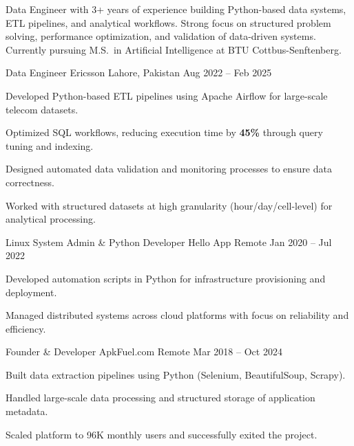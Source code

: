 \documentclass[11pt, a4paper]{awesome-cv}
\begin{document}
\makecvheader[C]


\begin{cvparagraph}
Data Engineer with 3+ years of experience building Python-based data systems, ETL pipelines, and analytical workflows. Strong focus on structured problem solving, performance optimization, and validation of data-driven systems. Currently pursuing M.S.\ in Artificial Intelligence at BTU Cottbus-Senftenberg.
\end{cvparagraph}


\begin{cventries}

\cventry
{Data Engineer}
{Ericsson}
{Lahore, Pakistan}
{Aug 2022 -- Feb 2025}
{
\begin{cvitems}
\item {Developed Python-based ETL pipelines using Apache Airflow for large-scale telecom datasets.}
\item {Optimized SQL workflows, reducing execution time by \textbf{45\%} through query tuning and indexing.}
\item {Designed automated data validation and monitoring processes to ensure data correctness.}
\item {Worked with structured datasets at high granularity (hour/day/cell-level) for analytical processing.}
\end{cvitems}
}

\cventry
{Linux System Admin \& Python Developer}
{Hello App}
{Remote}
{Jan 2020 -- Jul 2022}
{
\begin{cvitems}
\item {Developed automation scripts in Python for infrastructure provisioning and deployment.}
\item {Managed distributed systems across cloud platforms with focus on reliability and efficiency.}
\end{cvitems}
}

\cventry
{Founder \& Developer}
{ApkFuel.com}
{Remote}
{Mar 2018 -- Oct 2024}
{
\begin{cvitems}
\item {Built data extraction pipelines using Python (Selenium, BeautifulSoup, Scrapy).}
\item {Handled large-scale data processing and structured storage of application metadata.}
\item {Scaled platform to 96K monthly users and successfully exited the project.}
\end{cvitems}
}

\end{cventries}
\end{document}
